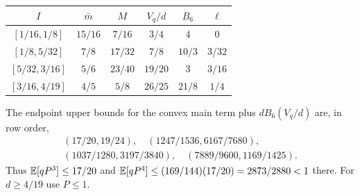 \begin{center}\small
\begin{tabular}{@{}cccccc@{}}\toprule
$I$&$\bar m$&$M$&$V_q/d$&$B_6$&$\ell$\\\midrule
$[1/16,1/8]$&$15/16$&$7/16$&$3/4$&$4$&$0$\\
$[1/8,5/32]$&$7/8$&$17/32$&$7/8$&$10/3$&$3/32$\\
$[5/32,3/16]$&$5/6$&$23/40$&$19/20$&$3$&$3/16$\\
$[3/16,4/19]$&$4/5$&$5/8$&$26/25$&$21/8$&$1/4$\\\bottomrule
\end{tabular}
\end{center}
The endpoint upper bounds for the convex main term plus
$dB_6(V_q/d)$ are, in row order,
\begin{gather*}
 (17/20,19/24),\quad(1247/1536,6167/7680),\\
 (1037/1280,3197/3840),\quad(7889/9600,1169/1425).
\end{gather*}
Thus $\mathbb E[qP^3]\le17/20$ and
$\mathbb E[qP^4]\le(169/144)(17/20)=2873/2880<1$ there.
For $d\ge4/19$ use $P\le1$.

